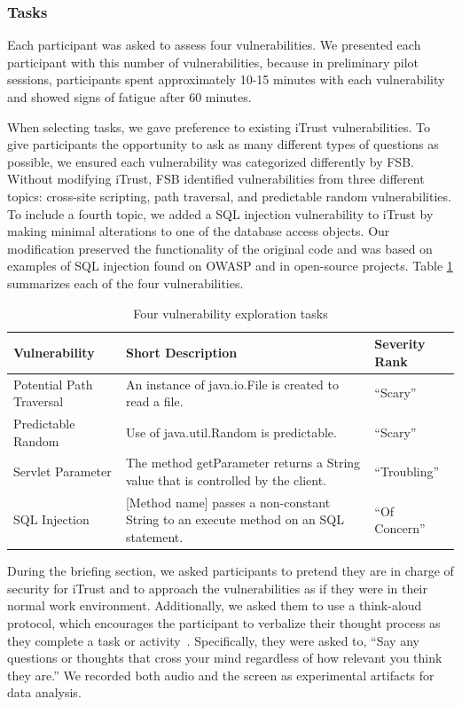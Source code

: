\documentclass{acm_proc_article-sp}
\begin{document}
\subsubsection{Tasks}
Each participant was asked to assess four vulnerabilities. 
We presented each participant with this number of vulnerabilities, because in preliminary pilot sessions, participants spent approximately 10-15 minutes with each vulnerability and showed signs of fatigue after 60 minutes.

When selecting tasks, we gave preference to existing iTrust vulnerabilities.
To give participants the opportunity to ask as many different types of questions as possible, we ensured each vulnerability was categorized differently by FSB.
Without modifying iTrust, FSB identified vulnerabilities from three different topics: cross-site scripting, path traversal, and predictable random vulnerabilities.
To include a fourth topic, we added a SQL injection vulnerability to iTrust by making minimal alterations to one of the database access objects.
Our modification preserved the functionality of the original code and was based on examples of SQL injection found on OWASP and in open-source projects.
Table \ref{table:vulnerabilities} summarizes each of the four vulnerabilities. 

\begin{table} 
\centering
\caption{Four vulnerability exploration tasks}
\begin{tabular}{|l|l|l|}
\rowcolor{gray!50}
\hline
    Vulnerability				& Short Description													& Severity Rank 	\\
    \hline	
    Potential Path Traversal	& An instance of java.io.File is created to read a file.     			& ``Scary''	    \\
    \hline
    Predictable Random			& Use of java.util.Random is predictable. 								& ``Scary''		\\
    \hline
    Servlet Parameter 			& The method getParameter returns a String value that is controlled by the client.			& ``Troubling''	\\
    \hline
    SQL Injection				& [Method name] passes a non-constant String to an execute method on an SQL statement.     	& ``Of Concern'' \\
    \hline
\end{tabular}
\label{table:vulnerabilities}
\end{table}

During the briefing section, we asked participants to pretend they are in charge of security for iTrust and to approach the vulnerabilities as if they were in their normal work environment.
Additionally, we asked them to use a think-aloud protocol, which encourages the participant to verbalize their thought process as they complete a task or activity~\cite{nielsen2002getting}. 
Specifically, they were asked to, ``Say any questions or thoughts that cross your mind regardless of how relevant you think they are.''
We recorded both audio and the screen as experimental artifacts for data analysis.
\end{document}
